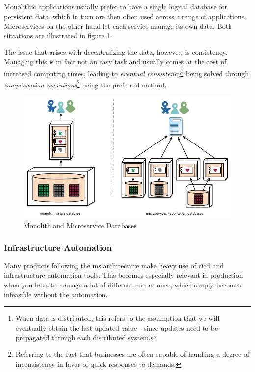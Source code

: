 Monolithic applications usually prefer to have a single logical
database for persistent data, which in turn are then often used across
a range of applications. Microservices on the other hand let each
service manage its own data. Both situations are illustrated in 
figure \ref{fig:databases}. \cite{ms-definition}

The issue that arises with decentralizing the data, however, is
consistency.  Managing this is in fact not an easy task and usually
comes at the cost of increased computing times, leading to
\textit{eventual consistency}\footnote{When data is distributed, this
	refers to the assumption that we will eventually obtain the last
	updated value---since updates need to be propagated through each
	distributed system.} being solved through \textit{compensation
operations}\footnote{Referring to the fact that businesses are often
capable of handling a degree of inconsistency in favor of quick
responses to demands.} being the preferred method.
\cite{ms-definition}

\begin{figure}
	\centering
	\includegraphics[width=\linewidth]{images/decentralised-data.png}
	\caption{Monolith and Microservice Databases \cite{ms-definition}}
	\label{fig:databases}
\end{figure}

\subsubsection{Infrastructure Automation}
\label{sec:infrastructure-automation}

Many products following the \gls{ms} architecture make heavy use of
\gls{cicd} and infrastructure automation tools. This becomes
especially relevant in production when you have to manage a lot of
different \glspl{ms} at once, which simply becomes infeasible without
the automation.  \cite{ms-definition}

